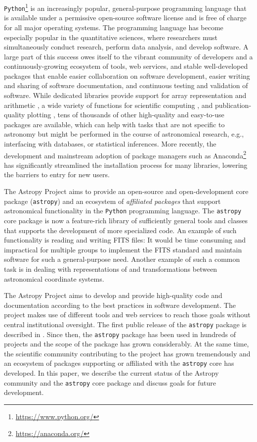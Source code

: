 \documentclass[modern]{aastex62}
\newcommand{\package}[1]{\texttt{#1}\xspace}
\newcommand{\python}{\package{Python}}
\newcommand{\astropy}{Astropy\xspace}
\newcommand{\astropypkg}{\package{astropy}}
\begin{document}
\python\footnote{\url{https://www.python.org/}} is an increasingly popular, general-purpose
programming language that is available under a permissive open-source software license and is free of
charge for all major operating systems. The programming language has become especially popular
in the quantitative sciences, where researchers must simultaneously conduct research, perform
data analysis, and develop software. A large part of this success owes itself to the vibrant
community of developers and a continuously-growing ecosystem of tools, web services, and stable
well-developed packages that enable easier collaboration on software development, easier
writing and sharing of software documentation, and continuous testing and validation of
software. While dedicated libraries provide support for array representation and
arithmetic \citep[\package{numpy};][]{numpy}, a wide variety of functions for scientific
computing \citep[\package{scipy};][]{scipy}, and publication-quality plotting
\citep[\package{matplotlib};][]{matplotlib}, tens of thousands of other high-quality and easy-to-use
packages are available, which can help with tasks that are not specific to astronomy but
might be performed in the course of astronomical research, e.g., interfacing with
databases, or statistical inferences.
More recently, the development and mainstream adoption of package managers such
as Anaconda\footnote{\url{https://anaconda.org/}} has significantly streamlined
the installation process for many libraries, lowering the barriers to entry for new users.

The \astropy Project aims to provide an open-source and open-development core
package (\astropypkg) and an ecosystem of \emph{affiliated packages} that
support astronomical functionality in the \python programming language.
The \astropypkg core package is now a feature-rich library of sufficiently
general tools and classes that supports the development of more specialized
code. An example of such functionality is reading and writing FITS files: It would be
time consuming and impractical for multiple groups to implement the FITS
standard \citep{FITS} and maintain software for such a general-purpose need.
Another example of such a common task is in dealing with representations of and
transformations between astronomical coordinate systems.

The \astropy Project aims to develop and provide high-quality code and
documentation according to the best practices in software development.
The project makes use of different tools and web services to reach those
goals without central institutional oversight.
The first public release of the \astropypkg package is described in
\cite{astropy}. Since then, the \astropypkg package has been
used in hundreds of projects and the scope of the package has grown
considerably. At the same time, the scientific community
contributing to the project has grown tremendously and an ecosystem
of packages supporting or affiliated with the \astropypkg core has
developed.
In this paper, we describe the current status of the \astropy community and the
\astropypkg core package and discuss goals for future development.
\end{document}
